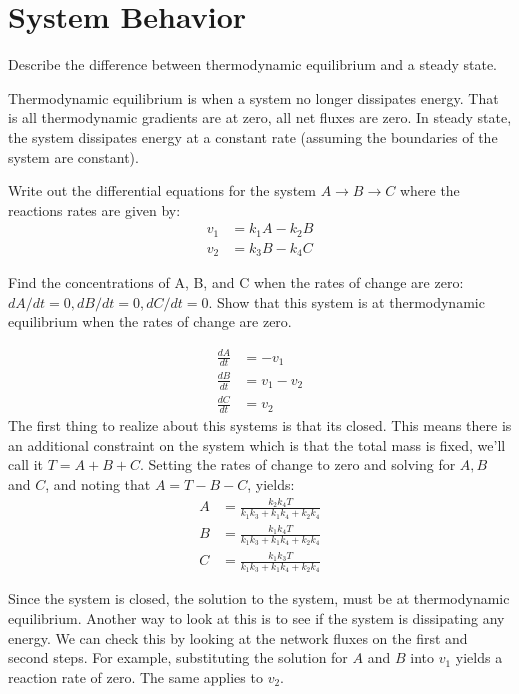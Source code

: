 \documentclass[12pt]{article}
\begin{document}


\section{System Behavior}


\begin{question}
Describe the difference between thermodynamic equilibrium and a steady state.
\end{question}
\begin{solution}
Thermodynamic equilibrium is when a system no longer dissipates energy. That is all thermodynamic gradients are at zero, all net fluxes are zero. In steady state, the system dissipates energy at a constant rate (assuming the boundaries of the system are constant).
\end{solution}



\begin{question}
Write out the differential equations for the system $A \rightarrow B \rightarrow C$ where the reactions rates are given by:
%
\begin{align*}
v_1 &= k_1 A - k_2 B \\
v_2 &= k_3 B - k_4 C
\end{align*}

Find the concentrations of A, B, and C when the rates of change are zero: $dA/dt=0, dB/dt=0, dC/dt=0$. Show that this system is at thermodynamic equilibrium when the rates of change are zero.
\end{question}
\begin{solution}
\begin{align*}
\frac{dA}{dt} &= -v_1 \\[5pt]
\frac{dB}{dt} &= v_1 - v_2 \\[5pt]
\frac{dC}{dt} &= v_2
\end{align*}
%
The first thing to realize about this systems is that its closed. This means there is an additional constraint on the system which is that the total mass is fixed, we'll call it $T = A + B + C$. Setting the rates of change to zero and solving for $A, B$ and $C$, and noting that $A = T - B - C$, yields:
%
\begin{align*}
A &= \frac{k_2 k_4 T}{k_1 k_3 + k_1 k_4 + k_2 k_4} \\[5pt]
B &= \frac{k_1 k_4 T}{k_1 k_3 + k_1 k_4 + k_2 k_4} \\[5pt]
C &= \frac{k_1 k_3 T}{k_1 k_3 + k_1 k_4 + k_2 k_4}
\end{align*}

Since the system is closed, the solution to the system, must be at thermodynamic equilibrium. Another way to look at this is to see if the system is dissipating any energy. We can check this by looking at the network fluxes on the first and second steps. For example, substituting the solution for $A$ and $B$ into $v_1$ yields a reaction rate of zero. The same applies to $v_2$.
\end{solution}
\end{document}
